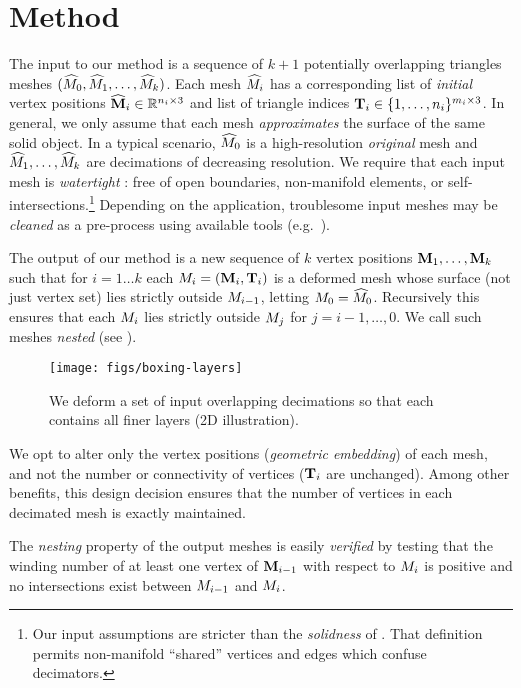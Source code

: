 \section{Method}
\label{sec:method}

The input to our method is a sequence of $k+1$ potentially overlapping
triangles meshes $(\widehat{M}_0,\widehat{M}_1,\dots,\widehat{M}_k)$.
%
Each mesh $\widehat{M}_i$ has a corresponding list of \emph{initial} vertex positions
$\widehat{\mathbf{M}}_i \in \mathbb{R}^{n_i \times 3}$ and list of triangle indices $\mathbf{T}_i \in
\{1,\dots,n_i\}^{m_i \times 3}$.
%
In general, we only assume that each mesh \emph{approximates} the surface of
the same solid object.
%
In a typical scenario, $\widehat{M}_0$ is a high-resolution \emph{original} mesh and
$\widehat{M}_1,\dots,\widehat{M}_k$ are decimations of decreasing resolution.
%
We require that each input mesh is \emph{watertight} \cite{Dey:2003jf}:
%
free of open boundaries, non-manifold elements, or
self-intersections.\footnote{Our input assumptions are stricter than the
\emph{solidness} of \cite{Bernstein:2013:PHH}. That definition permits
non-manifold ``shared'' vertices and edges which confuse decimators.}
%
Depending on the application, troublesome input meshes may be \emph{cleaned} as
a pre-process using available tools (e.g.\
\cite{Attene:2010vv,Jacobson:WN:2013}).

The output of our method is a new sequence of $k$ vertex positions
$\mathbf{M}_1,\dots,\mathbf{M}_k$ such that for $i=1\dots k$ each $M_i =
(\mathbf{M}_i,\mathbf{T}_i)$ is a deformed mesh whose surface (not just vertex set) lies
strictly outside $M_{i-1}$, letting $M_0 = \widehat{M}_0$. Recursively this
ensures that each $M_i$ lies strictly outside $M_j$ for
$j=i-1,\dots,0$. We call such meshes \emph{nested} (see
).

\begin{figure}
  \texttt{[image: figs/boxing-layers]}
  \caption{We deform a set of input overlapping decimations so that each
  contains all finer layers (2D illustration).}
  \label{fig:boxing-layers}
\end{figure}

We opt to alter only the vertex positions (\emph{geometric embedding}) of each
mesh, and not the number or connectivity of vertices ($\mathbf{T}_i$ are unchanged).
Among other benefits, this design decision ensures that the number of vertices
in each decimated mesh is exactly maintained.

The \emph{nesting} property of the output meshes is easily \emph{verified} by
testing that the winding number of at least one vertex of $\mathbf{M}_{i-1}$ with
respect to $M_i$ is positive and no intersections exist between
$M_{i-1}$ and $M_i$.

